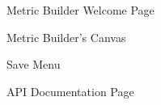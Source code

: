 			\begin{figure}[t]
				\centering
					\caption{Metric Builder Welcome Page}
					\label{fig:mb}
			\end{figure}
			
			\begin{figure}[t]
				\centering
					\caption{Metric Builder's Canvas}
					\label{fig:inuse}
			\end{figure}
			
			\begin{figure}[t]
				\centering
					\caption{Save Menu}
					\label{fig:save}
			\end{figure}
			
			\begin{figure}[t]
				\centering
					\caption{API Documentation Page}
					\label{fig:docs}
			\end{figure}